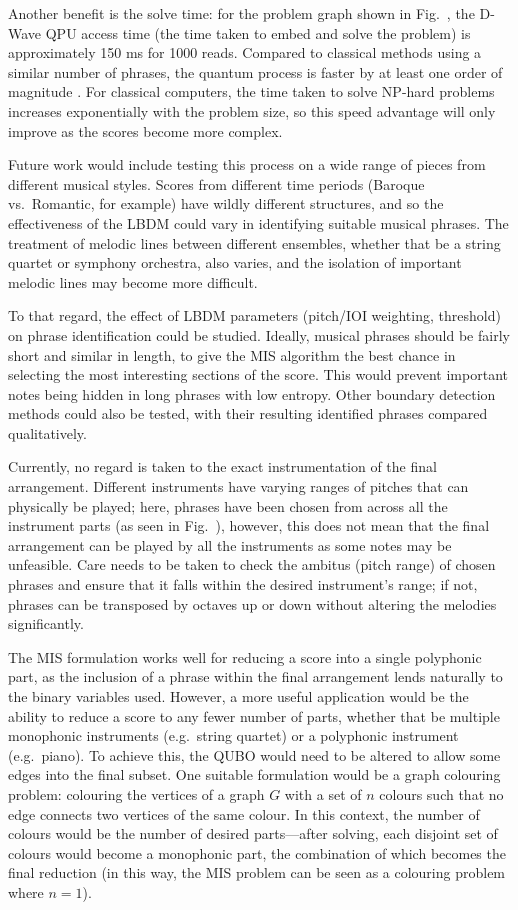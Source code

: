 \documentclass[12pt]{article}
\begin{document}
Another benefit is the solve time: for the problem graph shown in Fig.\  , the D-Wave QPU access time (the time taken to embed and solve the problem) is approximately 150 ms for 1000 reads. Compared to classical methods using a similar number of phrases, the quantum process is faster by at least one order of magnitude . For classical computers, the time taken to solve NP-hard problems increases exponentially with the problem size, so this speed advantage will only improve as the scores become more complex.

Future work would include testing this process on a wide range of pieces from different musical styles. Scores from different time periods (Baroque vs.\ Romantic, for example) have wildly different structures, and so the effectiveness of the LBDM could vary in identifying suitable musical phrases. The treatment of melodic lines between different ensembles, whether that be a string quartet or symphony orchestra, also varies, and the isolation of important melodic lines may become more difficult.

To that regard, the effect of LBDM parameters (pitch/IOI weighting, threshold) on phrase identification could be studied. Ideally, musical phrases should be fairly short and similar in length, to give the MIS algorithm the best chance in selecting the most interesting sections of the score. This would prevent important notes being hidden in long phrases with low entropy. Other boundary detection methods could also be tested, with their resulting identified phrases compared qualitatively.

Currently, no regard is taken to the exact instrumentation of the final arrangement. Different instruments have varying ranges of pitches that can physically be played; here, phrases have been chosen from across all the instrument parts (as seen in Fig.\  ), however, this does not mean that the final arrangement can be played by all the instruments as some notes may be unfeasible. Care needs to be taken to check the ambitus (pitch range) of chosen phrases and ensure that it falls within the desired instrument's range; if not, phrases can be transposed by octaves up or down without altering the melodies significantly.

The MIS formulation works well for reducing a score into a single polyphonic part, as the inclusion of a phrase within the final arrangement lends naturally to the binary variables used. However, a more useful application would be the ability to reduce a score to any fewer number of parts, whether that be multiple monophonic instruments (e.g.\ string quartet) or a polyphonic instrument (e.g.\ piano). To achieve this, the QUBO would need to be altered to allow some edges into the final subset. One suitable formulation would be a graph colouring problem: colouring the vertices of a graph $G$ with a set of $n$ colours such that no edge connects two vertices of the same colour. In this context, the number of colours would be the number of desired parts—after solving, each disjoint set of colours would become a monophonic part, the combination of which becomes the final reduction (in this way, the MIS problem can be seen as a colouring problem where $n=1$).
\end{document}
